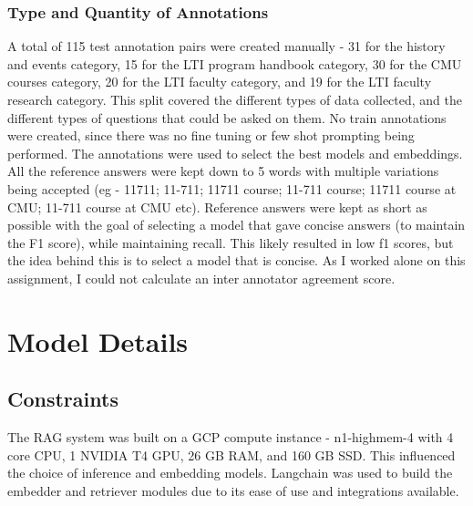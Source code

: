 \documentclass[11pt]{article}
\begin{document}
\subsubsection{Type and Quantity of Annotations}
A total of 115 test annotation pairs were created manually - 31 for the history and events category, 15 for the LTI program handbook category, 30 for the CMU courses category, 20 for the LTI faculty category, and 19 for the LTI faculty research category.
This split covered the different types of data collected, and the different types of questions that could be asked on them. No train annotations were created, since there was no fine tuning or few shot prompting being performed. The annotations were used to select the best models and embeddings.
All the reference answers were kept down to 5 words with multiple variations being accepted (eg - 11711; 11-711; 11711 course; 11-711 course; 11711 course at CMU; 11-711 course at CMU etc). Reference answers were kept as short as possible with the goal of selecting a model that gave concise answers (to maintain the F1 score), while maintaining recall.
This likely resulted in low f1 scores, but the idea behind this is to select a model that is concise.
As I worked alone on this assignment, I could not calculate an inter annotator agreement score.

\section{Model Details}

\subsection{Constraints}
The RAG system was built on a GCP compute instance - n1-highmem-4 with 4 core CPU, 1 NVIDIA T4 GPU, 26 GB RAM, and 160 GB SSD. This influenced the choice of inference and embedding models.
Langchain \cite{lang-chain} was used to build the embedder and retriever modules due to its ease of use and integrations available.
\end{document}
